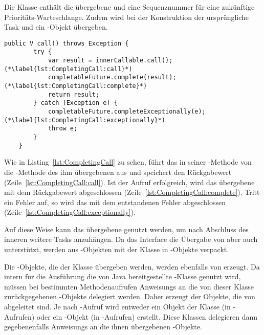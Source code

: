 Die Klasse  enthält die übergebene  und eine Sequenznummer für eine zukünftige Prioritäts-Warteschlange. Zudem wird bei der Konstruktion der ursprüngliche Task und ein -Objekt übergeben. 
\begin{lstlisting}[caption={\code{call()}-Methode von \class{CompletingCallable}. Das enthaltene \class{Callable} wird ausgeführt und dann das \class{CompletableFuture} abgeschlossen.}, label={lst:CompletingCall},float={thbp}]
	public V call() throws Exception {
		try {
			var result = innerCallable.call(); (*\label{lst:CompletingCall:call}*)
			completableFuture.complete(result); (*\label{lst:CompletingCall:complete}*)
			return result;
		} catch (Exception e) {
			completableFuture.completeExceptionally(e); (*\label{lst:CompletingCall:exceptionally}*)
			throw e;
		}
	}
\end{lstlisting}
Wie in Listing~\ref{lst:CompletingCall} zu sehen, führt das  in seiner -Methode von die -Methode des ihm übergebenen   aus und speichert den Rückgabewert (Zeile~\ref{lst:CompletingCall:call}). Ist der Aufruf erfolgreich, wird das übergebene  mit dem Rückgabewert abgeschlossen (Zeile~\ref{lst:CompletingCall:complete}). Tritt ein Fehler auf, so wird das   mit dem entstandenen Fehler abgeschlossen (Zeile~\ref{lst:CompletingCall:exceptionally}).

Auf diese Weise kann das übergebene  genutzt werden, um nach Abschluss des inneren  weitere Tasks anzuhängen.
Da das Interface  die Übergabe von  aber auch  unterstützt, werden aus -Objekten mit der Klasse  in -Objekte verpackt.

Die -Objekte, die der Klasse  übergeben werden, werden ebenfalls von  erzeugt. Da intern für die Ausführung die von Java bereitgestellte -Klasse genutzt wird, müssen bei bestimmten Methodenaufrufen \glspl{Anweisung} an die von dieser Klasse zurückgegebenen -Objekte delegiert werden. Daher erzeugt der 
 Objekte, die von  abgeleitet sind. Je nach -Aufruf wird entweder ein Objekt der Klasse  (in -Aufrufen) oder ein -Objekt (in -Aufrufen) erstellt. Diese Klassen delegieren dann gegebenenfalls \glspl{Anweisung} an die ihnen übergebenen -Objekte.

